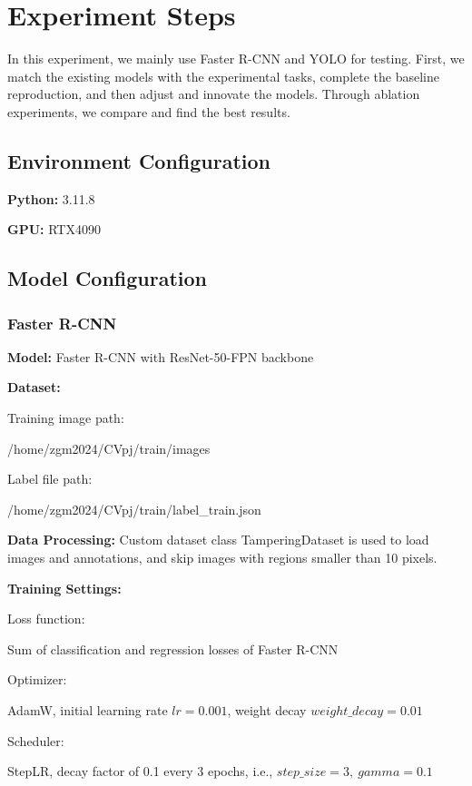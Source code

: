 \section{Experiment Steps}
\label{sec:steps}
In this experiment, we mainly use Faster R-CNN and YOLO for testing. First, we match the existing models with the experimental tasks, complete the baseline reproduction, and then adjust and innovate the models. Through ablation experiments, we compare and find the best results.

\subsection{Environment Configuration}
\noindent
\textbf{Python:} 3.11.8

\noindent
\textbf{GPU:} RTX4090

\subsection{Model Configuration}
\subsubsection{Faster R-CNN}
\noindent
\textbf{Model:} Faster R-CNN with ResNet-50-FPN backbone

\noindent
\textbf{Dataset:}

\noindent
Training image path:

/home/zgm2024/CVpj/train/images

\noindent
Label file path:

/home/zgm2024/CVpj/train/label\_train.json

\noindent
\textbf{Data Processing:} Custom dataset class TamperingDataset is used to load images and annotations, and skip images with regions smaller than 10 pixels.

\noindent
\textbf{Training Settings:}

\noindent
Loss function:

Sum of classification and regression losses of Faster R-CNN

\noindent
Optimizer:

AdamW, initial learning rate $lr = 0.001$, weight decay $weight\_decay = 0.01$

\noindent
Scheduler:

StepLR, decay factor of 0.1 every 3 epochs, i.e., $step\_size = 3,\ gamma = 0.1$

